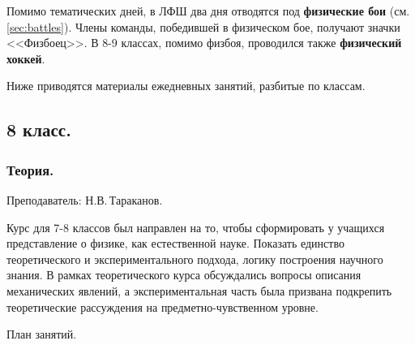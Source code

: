 \documentclass[12pt,a4paper,oneside,draft]{scrartcl}
\newlength{\h}
\newlength{\x}
\begin{document}
Помимо тематических дней, в ЛФШ два дня отводятся под
\textbf{физические бои} (см. \ref{sec:battles}). Члены команды,
победившей в физическом бое, получают значки <<Физбоец>>. В 8-9
классах, помимо физбоя, проводился также \textbf{физический хоккей}.

Ниже приводятся материалы ежедневных занятий, разбитые по классам. 

\subsection{8 класс.}
\label{sec:daily_8}

\subsubsection{Теория.}
\label{sec:daily_8_th}

\textsf{Преподаватель: Н.В.\,Тараканов.}
\smallskip

Курс для 7-8 классов был направлен на то, чтобы сформировать у
учащихся представление о физике, как естественной науке. Показать
единство теоретического и экспериментального подхода, логику
построения научного знания. В рамках теоретического курса обсуждались
вопросы описания механических явлений, а экспериментальная часть была
призвана подкрепить теоретические рассуждения на предметно-чувственном
уровне.

\begin{center}
  \textsf{План занятий.}
\end{center}
\end{document}
